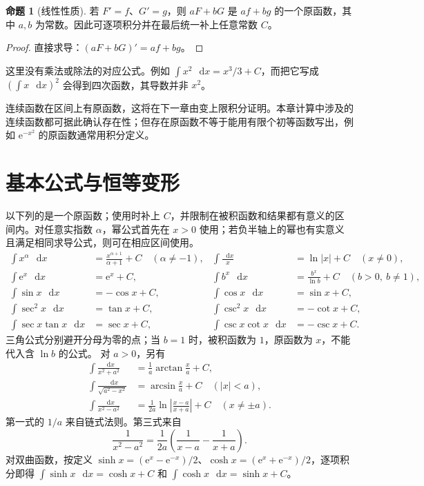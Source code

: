 \documentclass[UTF8,fontset=fandol,12pt,oneside,openany]{ctexrep}
\newcommand{\dd}{\mathop{}\!\mathrm d}
\newcommand{\ee}{\mathrm e}
\theoremstyle{definition}
\newtheorem{proposition}[theorem]{命题}
\begin{document}
\begin{proposition}[线性性质]
若 $F'=f$、$G'=g$，则 $aF+bG$ 是 $af+bg$ 的一个原函数，其中 $a,b$ 为常数。因此可逐项积分并在最后统一补上任意常数 $C$。
\end{proposition}
\begin{proof}
直接求导：$(aF+bG)'=af+bg$。
\end{proof}
这里没有乘法或除法的对应公式。例如 $\int x^2\,\dd x=x^3/3+C$，而把它写成 $(\int x\,\dd x)^2$ 会得到四次函数，其导数并非 $x^2$。

连续函数在区间上有原函数，这将在下一章由变上限积分证明。本章计算中涉及的连续函数都可据此确认存在性；但存在原函数不等于能用有限个初等函数写出，例如 $\ee^{-x^2}$ 的原函数通常用积分定义。

\section{基本公式与恒等变形}
以下列的是一个原函数；使用时补上 $C$，并限制在被积函数和结果都有意义的区间内。对任意实指数 $\alpha$，幂公式首先在 $x>0$ 使用；若负半轴上的幂也有实意义且满足相同求导公式，则可在相应区间使用。
\begin{align*}
\int x^\alpha\,\dd x&=\frac{x^{\alpha+1}}{\alpha+1}+C\quad(\alpha\ne-1),&
\int\frac{\dd x}{x}&=\ln|x|+C\quad(x\ne0),\\
\int\ee^x\,\dd x&=\ee^x+C,&
\int b^x\,\dd x&=\frac{b^x}{\ln b}+C\quad(b>0,
\ b\ne1),\\
\int\sin x\,\dd x&=-\cos x+C,&
\int\cos x\,\dd x&=\sin x+C,\\
\int\sec^2x\,\dd x&=\tan x+C,&
\int\csc^2x\,\dd x&=-\cot x+C,\\
\int\sec x\tan x\,\dd x&=\sec x+C,&
\int\csc x\cot x\,\dd x&=-\csc x+C.
\end{align*}
三角公式分别避开分母为零的点；当 $b=1$ 时，被积函数为 $1$，原函数为 $x$，不能代入含 $\ln b$ 的公式。
对 $a>0$，另有
\begin{align*}
\int\frac{\dd x}{x^2+a^2}&=\frac1a\arctan\frac xa+C,\\
\int\frac{\dd x}{\sqrt{a^2-x^2}}&=\arcsin\frac xa+C\quad(|x|<a),\\
\int\frac{\dd x}{x^2-a^2}&=\frac1{2a}\ln\left|\frac{x-a}{x+a}\right|+C\quad(x\ne\pm a).
\end{align*}
第一式的 $1/a$ 来自链式法则。第三式来自
\[
\frac1{x^2-a^2}=\frac1{2a}\left(\frac1{x-a}-\frac1{x+a}\right).
\]
对双曲函数，按定义 $\sinh x=(\ee^x-\ee^{-x})/2$、$\cosh x=(\ee^x+\ee^{-x})/2$，逐项积分即得 $\int\sinh x\,\dd x=\cosh x+C$ 和 $\int\cosh x\,\dd x=\sinh x+C$。
\end{document}
